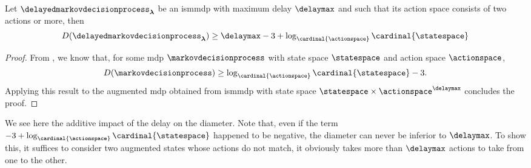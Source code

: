 \begin{prop}
    Let $\delayedmarkovdecisionprocess_{\boldsymbol\lambda}$ be an \gls{ismmdp} with maximum delay $\delaymax$ and such that its action space consists of two actions or more, then
    \begin{align*}
        D(\delayedmarkovdecisionprocess_{\boldsymbol\lambda})\geq \delaymax-3 + \log_{\cardinal{\actionspace}}\cardinal{\statespace}
    \end{align*}
\end{prop}
\begin{proof}
    From \cite[Corollary~15]{auer2008near}, we know that, for some \gls{mdp} $\markovdecisionprocess$ with state space $\statespace$ and action space $\actionspace$,
    \begin{align*}
        D(\markovdecisionprocess)\ge\log_{\cardinal{\actionspace}}\cardinal{\statespace}-3.
    \end{align*}
    Applying this result to the augmented \gls{mdp} obtained from \gls{ismmdp} with state space $\statespace\times\actionspace^{\delaymax}$ concludes the proof. 
\end{proof}

We see here the additive impact of the delay on the diameter. Note that, even if the term $-3 + \log_{\cardinal{\actionspace}}\cardinal{\statespace}$ happened to be negative, the diameter can never be inferior to $\delaymax$. To show this, it suffices to consider two augmented states whose actions do not match, it obviously takes more than $\delaymax$ actions to take from one to the other. 